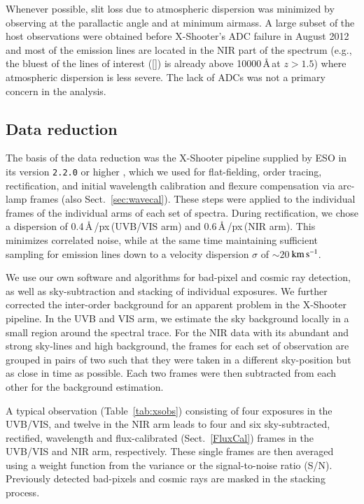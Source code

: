 \documentclass[traditabstract, longauth]{aa}
\newcommand{\kms}{$\rm{km\,s^{-1}}$}
\newcommand{\oii}{[\ion{O}{ii}]}
\begin{document}
Whenever possible, slit loss due to atmospheric dispersion was minimized by observing at the parallactic angle and at minimum airmass. A large subset of the host observations were obtained before X-Shooter's ADC failure in August 2012 and most of the emission lines are located in the NIR part of the spectrum (e.g., the bluest of the lines of interest (\oii) is already above 10000\,\AA\,at $z>1.5$) where atmospheric dispersion is less severe. The lack of ADCs was not a primary concern in the analysis.

\subsection{Data reduction}

The basis of the data reduction was the X-Shooter pipeline supplied by ESO in its version \texttt{2.2.0} or higher \citep{2006SPIE.6269E..80G, 2010SPIE.7737E..56M}, which we used for flat-fielding, order tracing, rectification, and initial wavelength calibration and flexure compensation via arc-lamp frames (also Sect.~\ref{sec:wavecal}). These steps were applied to the individual frames of the individual arms of each set of spectra. During rectification, we chose a dispersion of 0.4\,\AA\,/px\,(UVB/VIS arm) and 0.6\,\AA\,/px\,(NIR arm). This minimizes correlated noise, while at the same time maintaining sufficient sampling for emission lines down to a velocity dispersion $\sigma$ of $\sim20\,$\kms. 

We use our own software and algorithms for bad-pixel and cosmic ray detection, as well as sky-subtraction and stacking of individual exposures. We further corrected the inter-order background for an apparent problem in the X-Shooter pipeline. In the UVB and VIS arm, we estimate the sky background locally in a small region around the spectral trace. For the NIR data with its abundant and strong sky-lines and high background, the frames for each set of observation are grouped in pairs of two such that they were taken in a different sky-position but as close in time as possible. Each two frames were then subtracted from each other for the background estimation.

A typical observation (Table~\ref{tab:xsobs}) consisting of four exposures in the UVB/VIS, and twelve in the NIR arm leads to four and six sky-subtracted, rectified, wavelength and flux-calibrated (Sect.~\ref{FluxCal}) frames in the UVB/VIS and NIR arm, respectively. These single frames are then averaged using a weight function from the variance or the signal-to-noise ratio (S/N). Previously detected bad-pixels and cosmic rays are masked in the stacking process.
\end{document}
